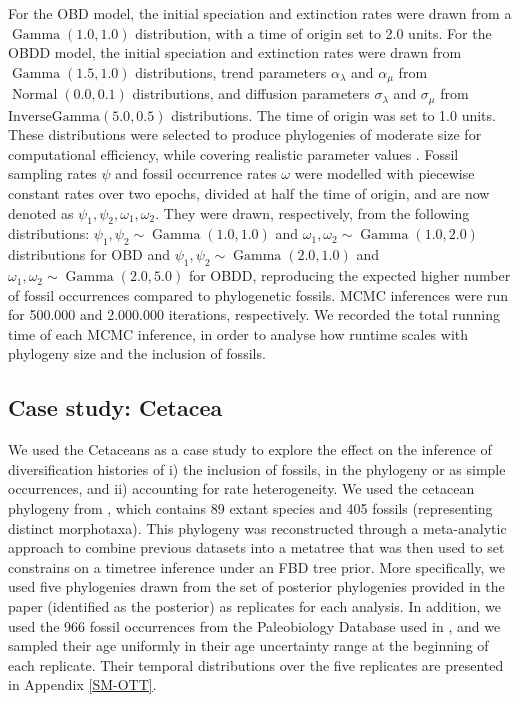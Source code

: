 \documentclass[oupdraft]{sysbio}
\DeclareMathOperator{\Gammadist}{Gamma}
\DeclareMathOperator{\Normal}{Normal}
\begin{document}
For the OBD model, the initial speciation and extinction rates were drawn from a $\Gammadist(1.0, 1.0)$ distribution, with a time of origin set to 2.0 units. For the OBDD model, the initial speciation and extinction rates were drawn from $\Gammadist(1.5, 1.0)$ distributions, trend parameters $\alpha_{\lambda}$ and $\alpha_{\mu}$ from $\Normal(0.0 ,0.1)$ distributions, and diffusion parameters $\sigma_{\lambda}$ and $\sigma_{\mu}$ from $\text{InverseGamma}(5.0, 0.5)$ distributions. The time of origin was set to 1.0 units. These distributions were selected to produce phylogenies of moderate size for computational efficiency, while covering realistic parameter values \citep{quintero_rise_2025}. Fossil sampling rates $\psi$ and fossil occurrence rates $\omega$ were modelled with piecewise constant rates over two epochs, divided at half the time of origin, and are now denoted as $\psi_1, \psi_2, \omega_1, \omega_2$. They were drawn, respectively, from the following distributions: $\psi_1, \psi_2 \sim \Gammadist(1.0, 1.0)$ and $\omega_1, \omega_2 \sim \Gammadist(1.0, 2.0)$ distributions for OBD and $\psi_1, \psi_2 \sim \Gammadist(2.0, 1.0)$ and $\omega_1, \omega_2 \sim \Gammadist(2.0, 5.0)$ for OBDD, reproducing the expected higher number of fossil occurrences compared to phylogenetic fossils. MCMC inferences were run for 500.000 and 2.000.000 iterations, respectively. We recorded the total running time of each MCMC inference, in order to analyse how runtime scales with phylogeny size and the inclusion of fossils.

\subsection{Case study: Cetacea}

We used the Cetaceans as a case study to explore the effect on the inference of diversification histories of i) the inclusion of fossils, in the phylogeny or as simple occurrences, and ii) accounting for rate heterogeneity. We used the cetacean phylogeny from \citet{lloyd_total-group_2021}, which contains 89 extant species and 405 fossils (representing distinct morphotaxa). This phylogeny was reconstructed through a meta-analytic approach to combine previous datasets into a metatree that was then used to set constrains on a timetree inference under an FBD tree prior. More specifically, we used five phylogenies drawn from the set of posterior phylogenies provided in the paper (identified as the  posterior) as replicates for each analysis. In addition, we used the 966 fossil occurrences from the Paleobiology Database \citep{mcclennen_paleobiology_2024} used in \citet{andreoletti_occurrence_2022}, and we sampled their age uniformly in their age uncertainty range at the beginning of each replicate. Their temporal distributions over the five replicates are presented in Appendix \ref{SM-OTT}.
\end{document}
